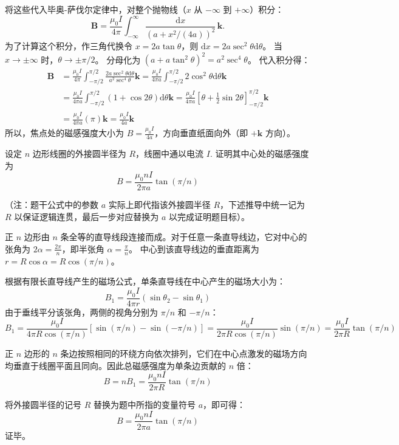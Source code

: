 \begin{solution}
将这些代入毕奥-萨伐尔定律中，对整个抛物线（$x$ 从 $-\infty$ 到 $+\infty$）积分：
\[
\boldsymbol B=\frac{\mu_0I}{4\pi}
\int_{-\infty}^{\infty}
\frac{\mathrm{d}x}{\left(a+x^2/(4a)\right)^2}\,\boldsymbol k.
\]
为了计算这个积分，作三角代换令 $x = 2a \tan\theta$，则 $\mathrm{d}x = 2a \sec^2\theta \mathrm{d}\theta$。
当 $x \to \pm\infty$ 时，$\theta \to \pm\pi/2$。
分母化为 $\left( a + a\tan^2\theta \right)^2 = a^2 \sec^4\theta$。
代入积分得：
\begin{align*}
    \boldsymbol{B} &= \frac{\mu_0 I}{4\pi} \int_{-\pi/2}^{\pi/2} \frac{2a \sec^2\theta \mathrm{d}\theta}{a^2 \sec^4\theta} \mathbf{k} = \frac{\mu_0 I}{4\pi a} \int_{-\pi/2}^{\pi/2} 2\cos^2\theta \mathrm{d}\theta \mathbf{k} \\
    &= \frac{\mu_0 I}{4\pi a} \int_{-\pi/2}^{\pi/2} (1 + \cos 2\theta) \mathrm{d}\theta \mathbf{k} = \frac{\mu_0 I}{4\pi a} \left[ \theta + \frac{1}{2}\sin 2\theta \right]_{-\pi/2}^{\pi/2} \mathbf{k} \\
    &= \frac{\mu_0 I}{4\pi a} (\pi) \mathbf{k} = \frac{\mu_0 I}{4a} \mathbf{k}
\end{align*}
所以，焦点处的磁感强度大小为 $B = \frac{\mu_0 I}{4a}$，方向垂直纸面向外（即 $+\mathbf{k}$ 方向）。
\end{solution}

\begin{exercise}\label{ex:17.5}
设定 $n$ 边形线圈的外接圆半径为 $R$，线圈中通以电流 $I$. 证明其中心处的磁感强度为
$$ B = \frac{\mu_0 n I}{2\pi a} \tan(\pi/n) $$
\end{exercise}
\begin{solution}
（注：题干公式中的参数 $a$ 实际上即代指该外接圆半径 $R$，下述推导中统一记为 $R$ 以保证逻辑连贯，最后一步对应替换为 $a$ 以完成证明题目标）。

正 $n$ 边形由 $n$ 条全等的直导线段连接而成。对于任意一条直导线边，它对中心的张角为 $2\alpha = \frac{2\pi}{n}$，即半张角 $\alpha = \frac{\pi}{n}$。
中心到该直导线边的垂直距离为 $r = R \cos\alpha = R \cos(\pi/n)$。

根据有限长直导线产生的磁场公式，单条直导线在中心产生的磁场大小为：
$$ B_1 = \frac{\mu_0 I}{4\pi r} (\sin\theta_2 - \sin\theta_1) $$
由于垂线平分该张角，两侧的视角分别为 $\pi/n$ 和 $-\pi/n$：
$$ B_1 = \frac{\mu_0 I}{4\pi R \cos(\pi/n)} \left[ \sin(\pi/n) - \sin(-\pi/n) \right] = \frac{\mu_0 I}{2\pi R \cos(\pi/n)} \sin(\pi/n) = \frac{\mu_0 I}{2\pi R} \tan(\pi/n) $$

正 $n$ 边形的 $n$ 条边按照相同的环绕方向依次排列，它们在中心点激发的磁场方向均垂直于线圈平面且同向。因此总磁感强度为单条边贡献的 $n$ 倍：
$$ B = n B_1 = \frac{\mu_0 n I}{2\pi R} \tan(\pi/n) $$

将外接圆半径的记号 $R$ 替换为题中所指的变量符号 $a$，即可得：
$$ B = \frac{\mu_0 n I}{2\pi a} \tan(\pi/n) $$
证毕。
\end{solution}


